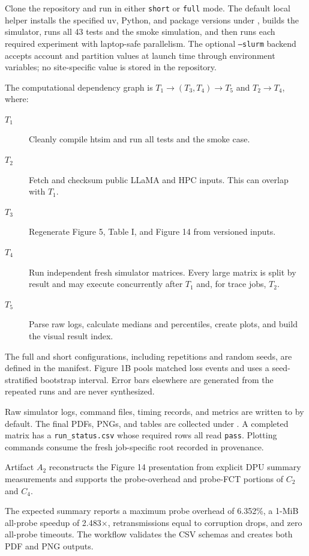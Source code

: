 \documentclass[conference]{IEEEtran}
\begin{document}
Clone the repository and run  in either \texttt{short} or
\texttt{full} mode. The default local helper installs the specified uv, Python,
and package versions under , builds the simulator,
runs all 43 tests and the smoke simulation, and then runs each required
experiment with laptop-safe parallelism. The optional \texttt{--slurm} backend
accepts account and partition values at launch time through environment
variables; no site-specific value is stored in the repository.

\artcomp
The computational dependency graph is
$T_1\rightarrow(T_3,T_4)\rightarrow T_5$ and
$T_2\rightarrow T_4$, where:
\begin{description}
\item[$T_1$] Cleanly compile htsim and run all tests and the smoke case.
\item[$T_2$] Fetch and checksum public LLaMA and HPC inputs. This can overlap
with $T_1$.
\item[$T_3$] Regenerate Figure 5, Table I, and Figure 14 from versioned inputs.
\item[$T_4$] Run independent fresh simulator matrices. Every large matrix is
split by result and may execute concurrently after $T_1$ and, for trace jobs,
$T_2$.
\item[$T_5$] Parse raw logs, calculate medians and percentiles, create plots,
and build the visual result index.
\end{description}

The full and short configurations, including repetitions and random seeds, are
defined in the manifest. Figure 1B pools matched loss events and uses a
seed-stratified bootstrap interval. Error bars elsewhere are generated from
the repeated runs and are never synthesized.

\artout
Raw simulator logs, command files, timing records, and metrics are written to
 by default. The final PDFs, PNGs, and
tables are collected under . A completed matrix has a
\texttt{run\_status.csv} whose required rows all read \texttt{pass}. Plotting
commands consume the fresh job-specific root recorded in provenance.

\newartifact
\artrel
Artifact $A_2$ reconstructs the Figure 14 presentation from explicit DPU
summary measurements and supports the probe-overhead and probe-FCT portions of
$C_2$ and $C_4$.

\artexp
The expected summary reports a maximum probe overhead of 6.352\%, a 1-MiB
all-probe speedup of 2.483$\times$, retransmissions equal to corruption drops,
and zero all-probe timeouts. The workflow validates the CSV schemas and creates
both PDF and PNG outputs.
\end{document}
